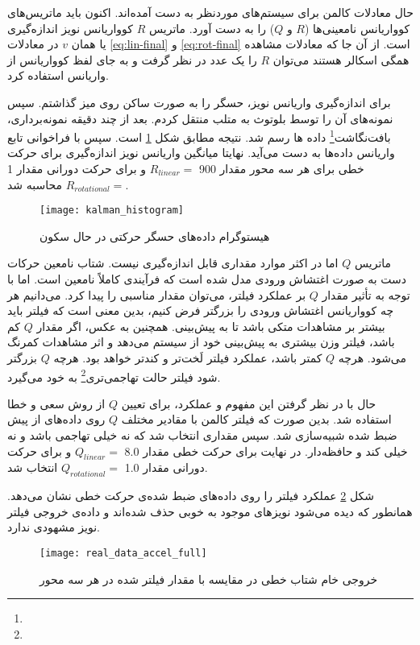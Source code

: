 حال معادلات کالمن برای سیستم‌های موردنظر به دست آمده‌اند. اکنون باید ماتریس‌های کوواریانس نامعینی‌ها ($R$ و $Q$) را به دست آورد. ماتریس $R$ کوواریانس نویز اندازه‌گیری یا همان $v$ در معادلات \ref{eq:lin-final} و \ref{eq:rot-final} است. از آن جا که معادلات مشاهده همگی اسکالر هستند می‌توان $R$ را یک عدد در نظر گرفت و به جای لفظ کوواریانس از واریانس استفاده کرد.

برای اندازه‌گیری واریانس نویز، حسگر را به صورت ساکن روی میز گذاشتم. سپس نمونه‌های آن را توسط بلوتوث به متلب منتقل کردم. بعد از چند دقیقه نمونه‌برداری، بافت‌نگاشت\footnote{} داده ها رسم شد. نتیجه مطابق شکل \ref{fig:kalman-histogram} است. سپس با فراخوانی تابع  واریانس داده‌ها به دست می‌آید. نهایتا میانگین واریانس نویز اندازه‌گیری برای حرکت خطی برای هر سه محور مقدار 900 $R_{linear}=$ و برای حرکت دورانی مقدار 1 $R_{rotational}=$ محاسبه شد.

\begin{figure}[h]
	\centering
	\texttt{[image: kalman\_histogram]}
	\caption{هیستوگرام داده‌های حسگر حرکتی در حال سکون}
	\label{fig:kalman-histogram}
\end{figure}

ماتریس $Q$ اما در اکثر موارد مقداری قابل اندازه‌گیری نیست. شتاب نامعین حرکات دست به صورت اغتشاش ورودی مدل شده است که فرآیندی کاملاً نامعین است. اما با توجه به تأثیر مقدار $Q$ بر عملکرد فیلتر، می‌توان مقدار مناسبی را پیدا کرد. می‌دانیم هر چه کوواریانس اغتشاش ورودی را بزرگتر فرض کنیم، بدین معنی است که فیلتر باید بیشتر بر مشاهدات متکی باشد تا به پیش‌بینی. همچنین به عکس، اگر مقدار $Q$ کم باشد، فیلتر وزن بیشتری به پیش‌بینی خود از سیستم می‌دهد و اثر مشاهدات کمرنگ می‌شود. هرچه $Q$ کمتر باشد، عملکرد فیلتر لَخت‌تر و کندتر خواهد بود. هرچه $Q$ بزرگتر شود فیلتر حالت تهاجمی‌تری\footnote{} به خود می‌گیرد.

حال با در نظر گرفتن این مفهوم و عملکرد، برای تعیین $Q$ از روش سعی و خطا استفاده شد. بدین صورت که فیلتر کالمن با مقادیر مختلف $Q$ روی داده‌های از پیش ضبط شده شبیه‌سازی شد. سپس مقداری انتخاب شد که نه خیلی تهاجمی باشد و نه خیلی کند و حافظه‌دار. در نهایت برای حرکت خطی مقدار 8.0 $Q_{linear}=$ و برای حرکت دورانی مقدار 1.0 $Q_{rotational}=$ انتخاب شد.

شکل \ref{fig:kalman-accel-filtered-full} عملکرد فیلتر را روی داده‌های ضبط شده‌ی حرکت خطی نشان می‌دهد. همانطور که دیده می‌شود نویزهای موجود به خوبی حذف شده‌اند و داده‌ی خروجی فیلتر نویز مشهودی ندارد.

\begin{figure}[h]
	\centering
	\texttt{[image: real\_data\_accel\_full]}
	\caption{خروجی خام شتاب خطی در مقایسه با مقدار فیلتر شده در هر سه محور}
	\label{fig:kalman-accel-filtered-full}
\end{figure}

